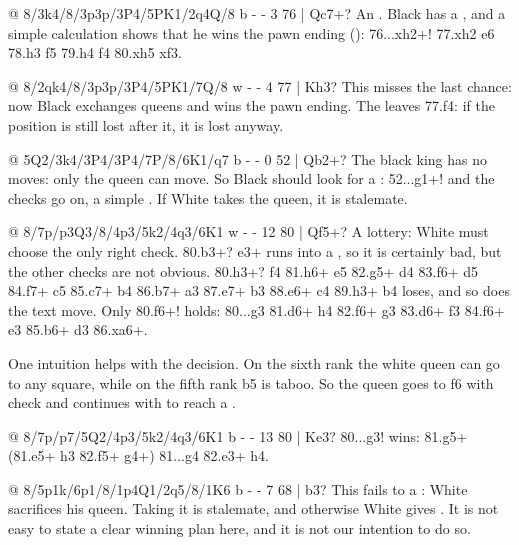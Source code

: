 @ 8/3k4/8/3p3p/3P4/5PK1/2q4Q/8 b - - 3 76 | Qc7+?
An . Black has a , and a simple calculation shows that he wins
the pawn ending (): 76...\Q xh2+! 77.\K xh2 \K e6 78.\K h3 \K f5
79.\K h4 \K f4 80.\K xh5 \K xf3.

@ 8/2qk4/8/3p3p/3P4/5PK1/7Q/8 w - - 4 77 | Kh3?
This misses the last chance: now Black exchanges queens and wins the pawn ending. The
 leaves 77.f4: if the
position is still lost after it, it is lost anyway.

@ 5Q2/3k4/3P4/3P4/7P/8/6K1/q7 b - - 0 52 | Qb2+?
The black king has no moves: only the queen can move. So Black should look for a
: 52...\Q g1+! and the checks go on, a simple . If White
takes the queen, it is stalemate.

@ 8/7p/p3Q3/8/4p3/5k2/4q3/6K1 w - - 12 80 | Qf5+?
A  lottery: White must choose the only right check.
80.\Q b3+? \Q e3+ runs into a , so it is
certainly bad, but the other checks are not obvious. 80.\Q h3+? \K f4 81.\Q h6+ \K e5 82.\Q g5+
\K d4 83.\Q f6+ \K d5 84.\Q f7+ \K c5 85.\Q c7+ \K b4 86.\Q b7+ \K a3 87.\Q e7+ \K b3 88.\Q e6+
\Q c4 89.\Q h3+ \K b4 loses, and so does the text move. Only 80.\Q f6+! holds: 80...\K g3
81.\Q d6+ \K h4 82.\Q f6+ \K g3 83.\Q d6+ \K f3 84.\Q f6+ \K e3 85.\Q b6+ \K d3 86.\Q xa6+.

One intuition helps with the decision. On the sixth rank the white queen can go to any square,
while on the fifth rank b5 is taboo. So the queen goes to f6 with check and continues with  to reach a .

@ 8/7p/p7/5Q2/4p3/5k2/4q3/6K1 b - - 13 80 | Ke3?
80...\K g3! wins: 81.\Q g5+ (81.\Q e5+ \K h3 82.\Q f5+ \Q g4+) 81...\Q g4 82.\Q e3+ \K h4.

@ 8/5p1k/6p1/8/1p4Q1/2q5/8/1K6 b - - 7 68 | b3?
This fails to a : White sacrifices his queen. Taking it is stalemate, and
otherwise White gives . It is not easy to state a clear
winning plan here, and it is not our intention to do so.


